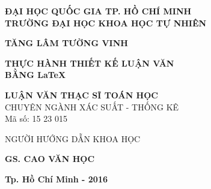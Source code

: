 \newpage
\thispagestyle{empty}
\begin{center}
{\bf  ĐẠI HỌC QUỐC GIA TP. HỒ CHÍ MINH}\\
{\bf TRƯỜNG ĐẠI HỌC KHOA HỌC TỰ NHIÊN}

\vspace*{1.5cm}

{\bf  TĂNG LÂM TƯỜNG VINH}

\vspace*{1.5cm}

\begin{center}
	{\huge\bf THỰC HÀNH THIẾT KẾ LUẬN VĂN\\ BẰNG  \LaTeX}
\end{center}


\vspace*{2.5cm}

{\bf LUẬN VĂN THẠC SĨ TOÁN HỌC}\\[20pt]
CHUYÊN NGÀNH XÁC SUẤT - THỐNG KÊ\\[10pt]
Mã số: 15 23 015

\vspace*{3cm}

NGƯỜI HƯỚNG DẪN KHOA HỌC

{\bf GS. CAO VĂN HỌC}

\vfill

{\bf Tp. Hồ Chí Minh - 2016}
\end{center}

